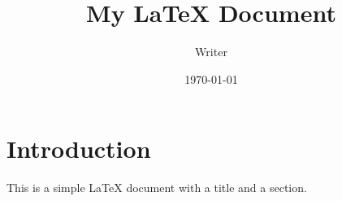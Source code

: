 \documentclass{article}
\title{My LaTeX Document}
\author{Writer}
\date{\today}
\begin{document}
\maketitle

\section{Introduction}
This is a simple LaTeX document with a title and a section.
\end{document}

